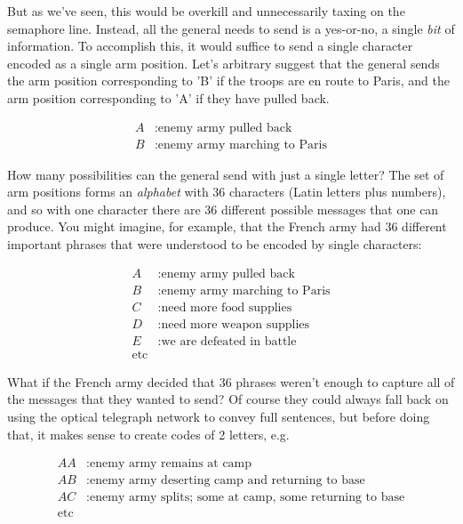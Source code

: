 \documentclass[UTF8]{book}
\begin{document}
\begin{CJK}{UTF8}{gbsn}
But as we've seen, this would be overkill and unnecessarily taxing on the semaphore line. Instead, all the general needs to send is a yes-or-no, a single \emph{bit} of information. To accomplish this, it would suffice to send a single character encoded as a single arm position. Let's arbitrary suggest that the general sends the arm position corresponding to 'B' if the troops are en route to Paris, and the arm position corresponding to 'A' if they have pulled back.

\begin{align*}
	A&: \text{enemy army pulled back} \\
	B&: \text{enemy army marching to Paris}
\end{align*}

How many possibilities can the general send with just a single letter? The set of arm positions forms an \emph{alphabet} with 36 characters (Latin letters plus numbers), and so with one character there are 36 different possible messages that one can produce. You might imagine, for example, that the French army had 36 different important phrases that were understood to be encoded by single characters:

\begin{align*}
	A&: \text{enemy army pulled back} \\
	B&: \text{enemy army marching to Paris} \\
	C&: \text{need more food supplies} \\
        D&: \text{need more weapon supplies} \\
        E&: \text{we are defeated in battle} \\
        \text{etc} &
\end{align*}

What if the French army decided that 36 phrases weren't enough to capture all of the messages that they wanted to send? Of course they could always fall back on using the optical telegraph network to convey full sentences, but before doing that, it makes sense to create codes of 2 letters, e.g.

\begin{align*}
	AA&: \text{enemy army remains at camp} \\
	AB&: \text{enemy army deserting camp and returning to base} \\
	AC&: \text{enemy army splits; some at camp, some returning to base} \\
        \text{etc} &
\end{align*}


\end{CJK}
\end{document}
